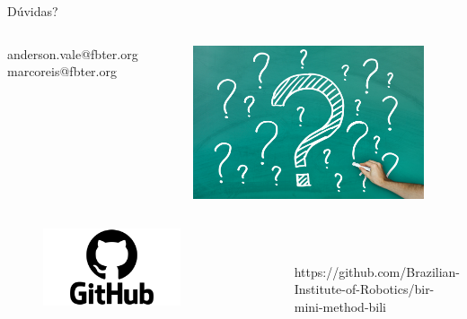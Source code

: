 \begin{frame}{Dúvidas?}
	\begin{columns}
		anderson.vale@fbter.org
		marcoreis@fbter.org
		\begin{figure}[hb]
      		\includegraphics[width=1\textwidth]{figures/duvida.jpg}
		\end{figure}
	\end{columns}

	\begin{columns}
		\column{.2\textwidth}
		\begin{figure}[!ht]
			\includegraphics[width=0.7\textwidth]{figures/github.png}
		\end{figure}
		\column{1\textwidth}
		\\~\\
		https://github.com/Brazilian-Institute-of-Robotics/bir-mini-method-bili
	\end{columns}
\end{frame}